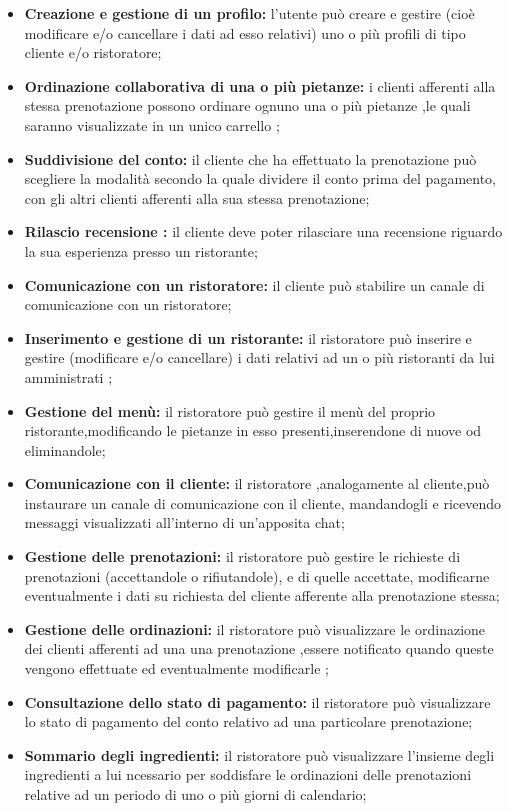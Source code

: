 \begin{itemize}
    \item \textbf{Creazione e gestione di un profilo:} l'utente può creare e gestire (cioè modificare e/o 
    cancellare i dati ad esso relativi) uno o più profili di tipo cliente e/o ristoratore;
    \item \textbf{Ordinazione collaborativa di una o più pietanze:} i clienti afferenti alla stessa prenotazione
    possono ordinare ognuno una o più pietanze ,le quali saranno visualizzate in un unico carrello ;
    \item \textbf{Suddivisione del conto:} il cliente che ha effettuato la prenotazione può scegliere la modalità secondo la quale 
    dividere il conto prima del pagamento, con gli altri clienti afferenti alla sua stessa prenotazione;
    \item \textbf{Rilascio recensione :} il cliente deve poter rilasciare una recensione riguardo la sua
    esperienza presso un ristorante;
    \item \textbf{Comunicazione con un ristoratore:} il cliente può stabilire un canale di comunicazione con un
    ristoratore;
    \item \textbf{Inserimento e gestione di un ristorante:} il ristoratore può inserire e gestire (modificare e/o cancellare)
    i dati relativi ad un o più ristoranti da lui amministrati ;
    \item \textbf{Gestione del menù:} il ristoratore può gestire il menù del proprio ristorante,modificando le pietanze in esso 
    presenti,inserendone di nuove od eliminandole;
    \item \textbf{Comunicazione con il cliente:} il ristoratore ,analogamente al cliente,può instaurare un canale di comunicazione
    con il cliente, mandandogli e ricevendo messaggi visualizzati all'interno di un'apposita chat;
    \item \textbf{Gestione delle prenotazioni:} il ristoratore può gestire le richieste di prenotazioni (accettandole o rifiutandole), e 
    di quelle accettate, modificarne eventualmente i dati su richiesta del cliente afferente alla prenotazione stessa;
    \item \textbf{Gestione delle ordinazioni:} il ristoratore può visualizzare le ordinazione dei clienti afferenti ad una
    una prenotazione ,essere notificato quando queste vengono effettuate ed eventualmente modificarle ;
    \item \textbf{Consultazione dello stato di pagamento:} il ristoratore può visualizzare lo stato di pagamento del conto relativo ad una
    particolare prenotazione;
    \item \textbf{Sommario degli ingredienti:} il ristoratore può visualizzare l'insieme degli ingredienti a lui ncessario per soddisfare 
    le ordinazioni delle prenotazioni  relative ad un periodo di uno o più giorni di calendario;
\end{itemize}